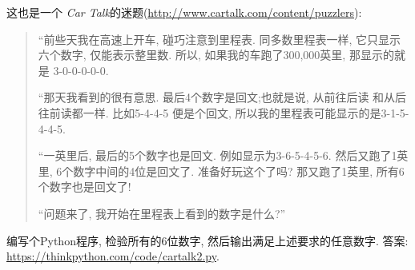 \documentclass[10pt]{book}
\begin{document}
\begin{exercise}
这也是一个 {\em Car Talk}的迷题(\url{http://www.cartalk.com/content/puzzlers}):

\begin{quote}
%
%

``前些天我在高速上开车, 碰巧注意到里程表. 
同多数里程表一样, 它只显示六个数字, 仅能表示整里数. 
所以, 如果我的车跑了300,000英里, 那显示的就是
3-0-0-0-0-0.

``那天我看到的很有意思. 最后4个数字是回文;也就是说, 从前往后读
和从后往前读都一样. 比如5-4-4-5 便是个回文, 
所以我的里程表可能显示的是3-1-5-4-4-5.

``一英里后, 最后的5个数字也是回文. 
例如显示为3-6-5-4-5-6. 然后又跑了1英里, 6个数字中间的4位是回文了. 
准备好玩这个了吗?  那又跑了1英里, 所有6个数字也是回文了!

``问题来了, 我开始在里程表上看到的数字是什么?''
\end{quote}

编写个Python程序, 检验所有的6位数字, 然后输出满足上述要求的任意数字. 
答案: \url{https://thinkpython.com/code/cartalk2.py}.

\end{exercise}
\end{document}
